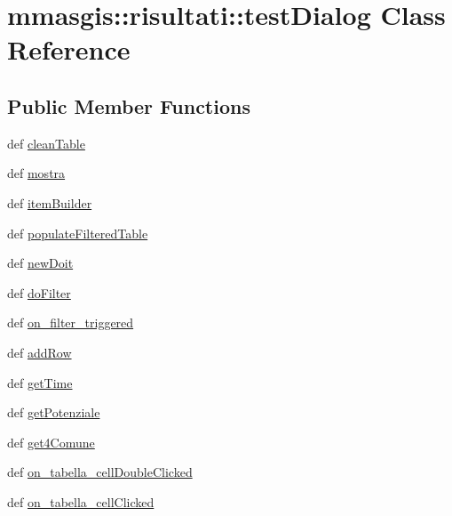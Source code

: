 \hypertarget{classmmasgis_1_1risultati_1_1testDialog}{
\section{mmasgis::risultati::testDialog Class Reference}
\label{classmmasgis_1_1risultati_1_1testDialog}
}
\subsection*{Public Member Functions}
\begin{DoxyCompactItemize}
\item 
def \hyperlink{classmmasgis_1_1risultati_1_1testDialog_a0ebef7c719ae7b22e66e91c57765ba89}{cleanTable}
\item 
def \hyperlink{classmmasgis_1_1risultati_1_1testDialog_acfdc738c49a667596857ca805aace727}{mostra}
\item 
def \hyperlink{classmmasgis_1_1risultati_1_1testDialog_a442a441a44282e5a78b947c53eb0e83e}{itemBuilder}
\item 
def \hyperlink{classmmasgis_1_1risultati_1_1testDialog_a98eb5d36d135011b0e82acb27bd363e8}{populateFilteredTable}
\item 
def \hyperlink{classmmasgis_1_1risultati_1_1testDialog_aeb21252257d8c2a4b17adf3ee347c0e2}{newDoit}
\item 
def \hyperlink{classmmasgis_1_1risultati_1_1testDialog_ad13908323dbfdcbec596b8acc26c8dc3}{doFilter}
\item 
def \hyperlink{classmmasgis_1_1risultati_1_1testDialog_a3681b83ce9155ca172136a40d0338ea9}{on\_\-filter\_\-triggered}
\item 
def \hyperlink{classmmasgis_1_1risultati_1_1testDialog_a2d0aa52ba63d36e826a5d746fe54fba7}{addRow}
\item 
def \hyperlink{classmmasgis_1_1risultati_1_1testDialog_af0f3417ce79cd904079e260a5018ec48}{getTime}
\item 
def \hyperlink{classmmasgis_1_1risultati_1_1testDialog_ac518908cf7a137928477ff971ca01fa0}{getPotenziale}
\item 
def \hyperlink{classmmasgis_1_1risultati_1_1testDialog_a8d09f7d8375eec6eb727fb59209c6703}{get4Comune}
\item 
def \hyperlink{classmmasgis_1_1risultati_1_1testDialog_a8b4c2c70e66056451f908a0d501ecfc9}{on\_\-tabella\_\-cellDoubleClicked}
\item 
def \hyperlink{classmmasgis_1_1risultati_1_1testDialog_a12670ad3bacaf85118f918801140b5ac}{on\_\-tabella\_\-cellClicked}

\end{DoxyCompactItemize}
